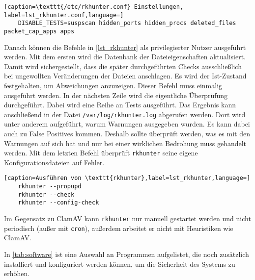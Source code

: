 \begin{lstlisting}[caption=\texttt{/etc/rkhunter.conf} Einstellungen, label=lst_rkhunter.conf,language=]
	DISABLE_TESTS=suspscan hidden_ports hidden_procs deleted_files packet_cap_apps apps
\end{lstlisting}

Danach können die Befehle in \autoref{lst_rkhunter} als privilegierter Nutzer ausgeführt werden. Mit dem ersten wird die Datenbank der Dateieigenschaften aktualisiert. Damit wird sichergestellt, dass die später durchgeführten Checks ausschließlich bei ungewollten Veränderungen der Dateien anschlagen. Es wird der Ist-Zustand festgehalten, um Abweichungen anzuzeigen. Dieser Befehl muss einmalig ausgeführt werden. In der nächsten Zeile wird die eigentliche Überprüfung durchgeführt. Dabei wird eine Reihe an Tests ausgeführt. Das Ergebnis kann anschließend in der Datei \texttt{/var/log/rkhunter.log} abgerufen werden. Dort wird unter anderem aufgeführt, warum Warnungen ausgegeben wurden. Es kann dabei auch zu False Positives kommen. Deshalb sollte überprüft werden, was es mit den Warnungen auf sich hat und nur bei einer wirklichen Bedrohung muss gehandelt werden. Mit dem letzten Befehl überprüft \texttt{rkhunter} seine eigene Konfigurationsdateien auf Fehler.\cite{RootkitHunterREADME}

\begin{lstlisting}[caption=Ausführen von \texttt{rkhunter},label=lst_rkhunter,language=]
	rkhunter --propupd
	rkhunter --check
	rkhunter --config-check
\end{lstlisting}

Im Gegensatz zu ClamAV kann \texttt{rkhunter} nur manuell gestartet werden und nicht periodisch {\small(außer mit \texttt{cron})}, außerdem arbeitet er nicht mit Heuristiken wie ClamAV.

In \autoref{tab:software} ist eine Auswahl an Programmen aufgelistet, die noch zusätzlich installiert und konfiguriert werden können, um die Sicherheit des Systems zu erhöhen.

